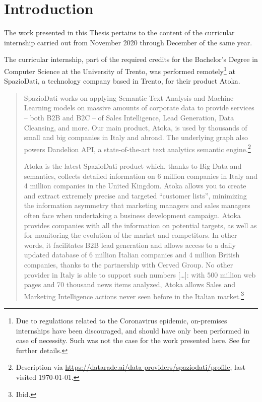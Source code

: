 \chapter{Introduction}
\label{ch:intro}

The work presented in this Thesis pertains to the content of the curricular internship carried out from November 2020 through December of the same year.

The curricular internship, part of the required credits for the Bachelor's Degree in Computer Science at the University of Trento, was performed remotely\footnote{%
Due to regulations related to the Coronavirus epidemic, on-premises internships have been discouraged, and should have only been performed in case of necessity. Such was not the case for the work presented here. See \cite{faq-covid} for further details.}
at SpazioDati, a technology company based in Trento, for their product Atoka.

\begin{quote}
SpazioDati works on applying Semantic Text Analysis and Machine Learning models on massive amounts of corporate data to provide services -- both B2B and B2C -- of Sales Intelligence, Lead Generation, Data Cleansing, and more.
Our main product, Atoka, is used by thousands of small and big companies in Italy and abroad. The underlying graph also powers Dandelion API, a state-of-the-art text analytics semantic engine.\footnote{%
Description via \url{https://datarade.ai/data-providers/spaziodati/profile}, last visited \today.
}

Atoka is the latest SpazioDati product which, thanks to Big Data and semantics, collects detailed information on 6 million companies in Italy and 4 million companies in the United Kingdom.
Atoka allows you to create and extract extremely precise and targeted ``customer lists'', minimizing the information asymmetry that marketing managers and sales managers often face when undertaking a business development campaign.
Atoka provides companies with all the information on potential targets, as well as for monitoring the evolution of the market and competitors.
In other words, it facilitates B2B lead generation and allows access to a daily updated database of 6 million Italian companies and 4 million British companies, thanks to the partnership with Cerved Group.
No other provider in Italy is able to support such numbers [\ldots]: with 500 million web pages and 70 thousand news items analyzed, Atoka allows Sales and Marketing Intelligence actions never seen before in the Italian market.\footnote{%
Ibid.
}
\end{quote}


